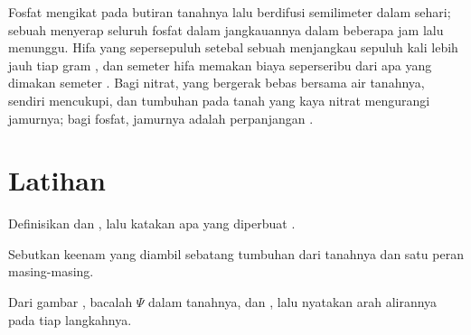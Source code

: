 \begin{example}\label{ex:b1:plant-water-minerals:phosphate}
Fosfat mengikat pada butiran tanahnya lalu berdifusi semilimeter dalam
sehari; sebuah  menyerap seluruh fosfat dalam jangkauannya
dalam beberapa jam lalu menunggu. Hifa yang sepersepuluh setebal
sebuah  menjangkau sepuluh kali lebih jauh tiap gram
, dan semeter hifa memakan biaya seperseribu dari apa yang
dimakan semeter . Bagi nitrat, yang bergerak bebas bersama air
tanahnya,  sendiri mencukupi, dan tumbuhan pada tanah
yang kaya nitrat mengurangi jamurnya; bagi fosfat, jamurnya adalah
perpanjangan .
\end{example}

\section{Latihan}

\begin{exercise}[$\star$]\label{exo:b1:plant-water-minerals:1}
Definisikan  dan , lalu katakan apa yang diperbuat .
\end{exercise}

\begin{exercise}[$\star$]\label{exo:b1:plant-water-minerals:2}
Sebutkan keenam  yang diambil sebatang tumbuhan dari
tanahnya dan satu peran masing-masing.
\end{exercise}

\begin{exercise}[$\star$]\label{exo:b1:plant-water-minerals:3}
Dari gambar , bacalah $\Psi$ dalam tanahnya, 
 dan  , lalu nyatakan arah alirannya pada tiap
langkahnya.
\end{exercise}

